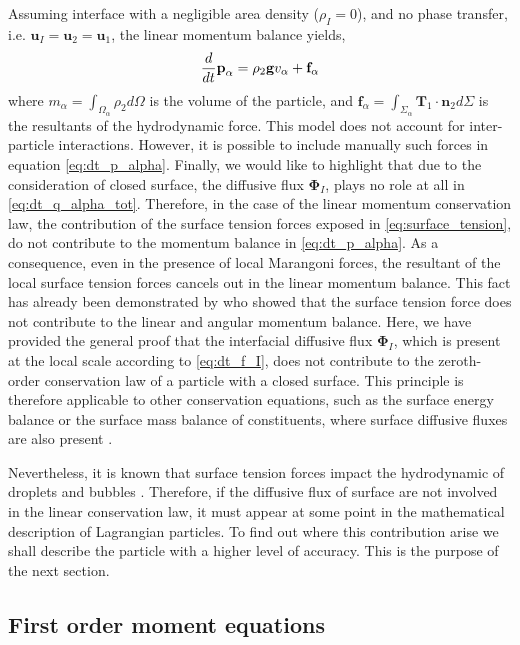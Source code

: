 Assuming interface with a negligible area density ($\rho_I=0$), and no phase transfer, i.e. $\textbf{u}_I=\textbf{u}_2=\textbf{u}_1$, the linear momentum balance yields, 
\begin{equation}
    \frac{d}{d t} \textbf{p}_\alpha
    = 
    \rho_2\textbf{g}v_\alpha
    + \textbf{f}_\alpha
    \label{eq:dt_p_alpha}
\end{equation}
where $m_\alpha = \int_{\Omega_\alpha}\rho_2 d\Omega$ is the volume of the particle, and $\textbf{f}_\alpha = \int_{\Sigma_\alpha}  \textbf{T}_1 \cdot \textbf{n}_2 d\Sigma$ is the resultants of the hydrodynamic force. 
This model does not account for inter-particle interactions. 
However, it is possible to include manually such forces in equation \ref{eq:dt_p_alpha}.
Finally, we would like to highlight that  due to the consideration of closed surface, the diffusive flux $\mathbf{\Phi}_I$, plays no role at all in \ref{eq:dt_q_alpha_tot}.
Therefore, in the case of the linear momentum conservation law, the contribution of the surface tension forces exposed in \ref{eq:surface_tension}, do not contribute to the momentum balance in \ref{eq:dt_p_alpha}.
As a consequence, even in the presence of local Marangoni forces, the resultant of the local surface tension forces cancels out in the linear momentum balance.
This fact has already been demonstrated by \citet{hesla1993note} who showed that the surface tension force does not contribute to the linear and angular momentum balance. 
Here, we have provided the general proof that the interfacial diffusive flux $\mathbf{\Phi}_I$, which is present at the local scale according to \ref{eq:dt_f_I}, does not contribute to the zeroth-order conservation law of a particle with a closed surface.
This principle is therefore applicable to other conservation equations, such as the surface energy balance or the surface mass balance of constituents, where surface diffusive fluxes are also present \citep{bothe2022sharp,manikantan2020surfactant}. 

Nevertheless, it is known that surface tension forces impact the hydrodynamic of droplets and bubbles \citep{kentheswaran2022direct,pesci2018computational}. 
Therefore, if the diffusive flux of surface are not involved in the linear conservation law, it must appear at some point in the mathematical description of Lagrangian particles. 
To find out where this contribution arise we shall describe the particle with a higher level of accuracy. 
This is the purpose of the next section. 

\subsection{First order moment equations}

